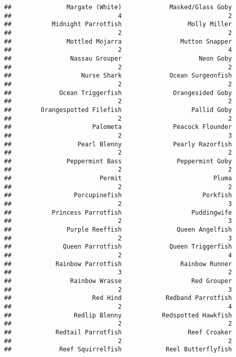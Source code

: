 \documentclass[
]{article}
\begin{document}
\begin{verbatim}
##               Margate (White)             Masked/Glass Goby 
##                             4                             2 
##           Midnight Parrotfish                  Molly Miller 
##                             2                             2 
##               Mottled Mojarra                Mutton Snapper 
##                             2                             4 
##                Nassau Grouper                     Neon Goby 
##                             2                             2 
##                   Nurse Shark             Ocean Surgeonfish 
##                             2                             2 
##             Ocean Triggerfish              Orangesided Goby 
##                             2                             2 
##        Orangespotted Filefish                   Pallid Goby 
##                             2                             2 
##                      Palometa              Peacock Flounder 
##                             2                             3 
##                  Pearl Blenny              Pearly Razorfish 
##                             2                             2 
##               Peppermint Bass               Peppermint Goby 
##                             2                             2 
##                        Permit                         Pluma 
##                             2                             2 
##                 Porcupinefish                      Porkfish 
##                             2                             3 
##           Princess Parrotfish                   Puddingwife 
##                             2                             3 
##               Purple Reeffish               Queen Angelfish 
##                             2                             3 
##              Queen Parrotfish             Queen Triggerfish 
##                             2                             4 
##            Rainbow Parrotfish                Rainbow Runner 
##                             3                             2 
##                Rainbow Wrasse                   Red Grouper 
##                             2                             3 
##                      Red Hind            Redband Parrotfish 
##                             2                             4 
##                 Redlip Blenny           Redspotted Hawkfish 
##                             2                             2 
##            Redtail Parrotfish                  Reef Croaker 
##                             2                             2 
##             Reef Squirrelfish            Reel Butterflyfish 

\end{verbatim}
\end{document}
